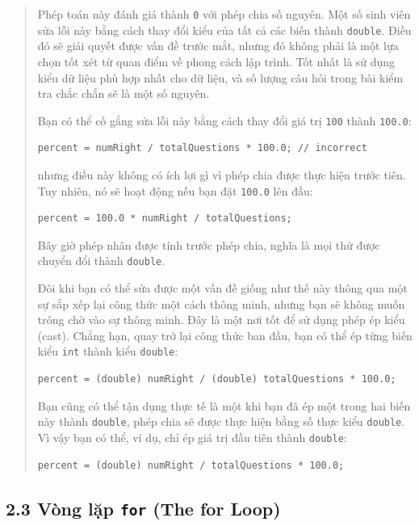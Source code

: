 \begin{quote}
Phép toán này đánh giá thành \texttt{0} với phép chia số nguyên. Một số
sinh viên sửa lỗi này bằng cách thay đổi kiểu của tất cả các biến thành
\texttt{double}. Điều đó sẽ giải quyết được vấn đề trước mắt, nhưng đó
không phải là một lựa chọn tốt xét từ quan điểm về phong cách lập trình.
Tốt nhất là sử dụng kiểu dữ liệu phù hợp nhất cho dữ liệu, và số lượng
câu hỏi trong bài kiểm tra chắc chắn sẽ là một số nguyên.

Bạn có thể cố gắng sửa lỗi này bằng cách thay đổi giá trị \texttt{100}
thành \texttt{100.0}:

\begin{verbatim}
percent = numRight / totalQuestions * 100.0; // incorrect
\end{verbatim}

nhưng điều này không có ích lợi gì vì phép chia được thực hiện trước
tiên. Tuy nhiên, nó sẽ hoạt động nếu bạn đặt \texttt{100.0} lên đầu:

\begin{verbatim}
percent = 100.0 * numRight / totalQuestions;
\end{verbatim}

Bây giờ phép nhân được tính trước phép chia, nghĩa là mọi thứ được
chuyển đổi thành \texttt{double}.

Đôi khi bạn có thể sửa được một vấn đề giống như thế này thông qua một
sự sắp xếp lại công thức một cách thông minh, nhưng bạn sẽ không muốn
trông chờ vào sự thông minh. Đây là một nơi tốt để sử dụng phép ép kiểu
(cast). Chẳng hạn, quay trở lại công thức ban đầu, bạn có thể ép từng
biến kiểu \texttt{int} thành kiểu \texttt{double}:

\begin{verbatim}
percent = (double) numRight / (double) totalQuestions * 100.0;
\end{verbatim}

Bạn cũng có thể tận dụng thực tế là một khi bạn đã ép một trong hai biến
này thành \texttt{double}, phép chia sẽ được thực hiện bằng số thực kiểu
\texttt{double}. Vì vậy bạn có thể, ví dụ, chỉ ép giá trị đầu tiên thành
\texttt{double}:

\begin{verbatim}
percent = (double) numRight / totalQuestions * 100.0;
\end{verbatim}
\end{quote}

\subsection{\texorpdfstring{2.3 Vòng lặp \texttt{for} (The for
Loop)}{2.3 Vòng lặp for (The for Loop)}}\label{vuxf2ng-lux1eb7p-for-the-for-loop}

